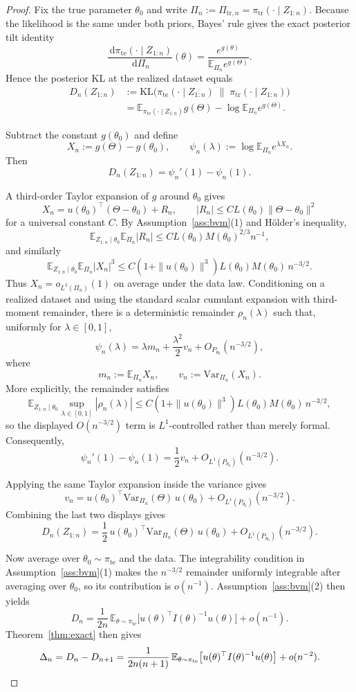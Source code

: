 \documentclass{article}
\theoremstyle{definition}
\theoremstyle{remark}
\newcommand{\E}{\mathbb{E}}
\newcommand{\KL}{\mathrm{KL}}
\newcommand{\Var}{\mathrm{Var}}
\newcommand{\tr}{\mathrm{tr}}
\newcommand{\te}{\mathrm{te}}
\newcommand{\dd}{\,\mathrm{d}}
\begin{document}
\begin{proof}
Fix the true parameter $\theta_0$ and write $\Pi_n:=\Pi_{\tr,n}=\pi_{\tr}(\cdot\mid Z_{1:n})$.
Because the likelihood is the same under both priors, Bayes' rule gives the exact posterior tilt identity
\[
\frac{\dd \pi_{\te}(\cdot\mid Z_{1:n})}{\dd \Pi_n}(\theta)
=
\frac{e^{g(\theta)}}{\E_{\Pi_n}e^{g(\Theta)}}.
\]
Hence the posterior KL at the realized dataset equals
\begin{align*}
D_n(Z_{1:n})
&:=
\KL\bigl(
\pi_{\te}(\cdot\mid Z_{1:n})
\;\|\;
\pi_{\tr}(\cdot\mid Z_{1:n})
\bigr) \\
&=
\E_{\pi_{\te}(\cdot\mid Z_{1:n})} g(\Theta)
- \log \E_{\Pi_n} e^{g(\Theta)}.
\end{align*}

Subtract the constant $g(\theta_0)$ and define
\[
X_n:=g(\Theta)-g(\theta_0),
\qquad
\psi_n(\lambda):=\log \E_{\Pi_n} e^{\lambda X_n}.
\]
Then
\[
D_n(Z_{1:n}) = \psi_n'(1)-\psi_n(1).
\]

A third-order Taylor expansion of $g$ around $\theta_0$ gives
\[
X_n
=
u(\theta_0)^\top(\Theta-\theta_0)
 + R_n,
\qquad
|R_n|
\le
C L(\theta_0)\|\Theta-\theta_0\|^2
\]
for a universal constant $C$. By Assumption~\ref{ass:bvm}(1) and H\"older's inequality,
\[
\E_{Z_{1:n}\mid \theta_0}\E_{\Pi_n}|R_n|
\le
C L(\theta_0) M(\theta_0)^{2/3} n^{-1},
\]
and similarly
\[
\E_{Z_{1:n}\mid \theta_0}\E_{\Pi_n}|X_n|^3
\le
C (1+\|u(\theta_0)\|^3)L(\theta_0)M(\theta_0)\,n^{-3/2}.
\]
Thus $X_n=o_{L^3(\Pi_n)}(1)$ on average under the data law. Conditioning on a realized dataset and using the standard scalar cumulant expansion with third-moment remainder, there is a deterministic remainder $\rho_n(\lambda)$ such that, uniformly for $\lambda\in[0,1]$,
\[
\psi_n(\lambda)
=
\lambda m_n + \frac{\lambda^2}{2}v_n + O_{P_{\theta_0}}(n^{-3/2}),
\]
where
\[
m_n:=\E_{\Pi_n}X_n,
\qquad
v_n:=\Var_{\Pi_n}(X_n).
\]
More explicitly, the remainder satisfies
\[
\E_{Z_{1:n}\mid \theta_0}\sup_{\lambda\in[0,1]}|\rho_n(\lambda)|
\le
C (1+\|u(\theta_0)\|^3)L(\theta_0)M(\theta_0)\,n^{-3/2},
\]
so the displayed $O(n^{-3/2})$ term is $L^1$-controlled rather than merely formal.
Consequently,
\[
\psi_n'(1)-\psi_n(1)
=
\frac{1}{2}v_n + O_{L^1(P_{\theta_0})}(n^{-3/2}).
\]

Applying the same Taylor expansion inside the variance gives
\[
v_n
=
u(\theta_0)^\top \Var_{\Pi_n}(\Theta)\,u(\theta_0)
+ O_{L^1(P_{\theta_0})}(n^{-3/2}).
\]
Combining the last two displays gives
\[
D_n(Z_{1:n})
=
\frac{1}{2}\,
u(\theta_0)^\top \Var_{\Pi_n}(\Theta)\,u(\theta_0)
+ O_{L^1(P_{\theta_0})}(n^{-3/2}).
\]

Now average over $\theta_0\sim\pi_{\te}$ and the data. The integrability condition in Assumption~\ref{ass:bvm}(1) makes the $n^{-3/2}$ remainder uniformly integrable after averaging over $\theta_0$, so its contribution is $o(n^{-1})$. Assumption~\ref{ass:bvm}(2) then yields
\[
D_n
=
\frac{1}{2n}\,
\E_{\theta\sim\pi_{\te}}
\bigl[
u(\theta)^\top I(\theta)^{-1}u(\theta)
\bigr]
+ o(n^{-1}).
\]
Theorem~\ref{thm:exact} then gives
\[
\Delta_n
=
D_n-D_{n+1}
=
\frac{1}{2n(n+1)}\,
\E_{\theta\sim\pi_{\te}}
\bigl[
u(\theta)^\top I(\theta)^{-1}u(\theta)
\bigr]
+ o(n^{-2}).
\qedhere
\]
\end{proof}
\end{document}
